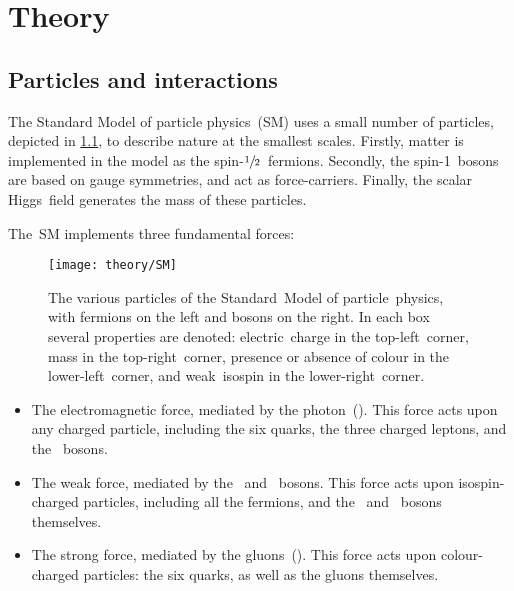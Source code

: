 
\chapter{Theory}
\label{chp:theory}

\vspace*{\fill}
\minitoc

\clearpage
\section{Particles and interactions}
\label{sec:SM}

The Standard Model of particle physics~(SM) uses a small number of particles, depicted in \cref{fig:theory_SM_Particles}, to describe nature at the smallest scales.
Firstly, matter is implemented in the model as the spin-\(\sfrac{1}{2}\)~fermions.
Secondly, the spin-1~bosons are based on gauge symmetries, and act as force-carriers.
Finally, the scalar Higgs~field generates the mass of these particles.

The~SM implements three fundamental forces:
%
\begin{figure}[b] \centerfloat
    \texttt{[image: theory/SM]}
    \caption{
        The various particles of the Standard~Model of particle~physics, with fermions on the left and bosons on the right.
        In each box several properties are denoted: electric~charge in the top-left~corner, mass in the top-right~corner, presence or absence of colour in the lower-left~corner, and weak~isospin in the lower-right~corner.}
    \label{fig:theory_SM_Particles}
\end{figure}
%
\begin{itemize}
    \item The electromagnetic force, mediated by the photon~(\g). This force acts upon any charged particle, including the six quarks, the three charged leptons, and the \Wpm~bosons.
    \item The weak force, mediated by the \Wpm~and \Z~bosons. This force acts upon isospin-charged particles, including all the fermions, and the \Wpm~and \Z~bosons themselves.
    \item The strong force, mediated by the gluons~(\gluon). This force acts upon colour-charged particles: the six quarks, as well as the gluons themselves.
\end{itemize}


